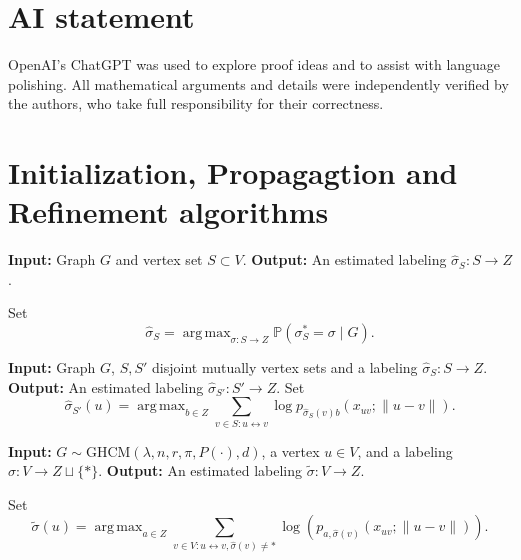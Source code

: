 \documentclass[11pt, a4paper]{amsart}
\newcommand{\1}{\mathbf{1}}
\newcommand{\visible}{\leftrightarrow{}}
\theoremstyle{definition}
\theoremstyle{remark}
\theoremstyle{definition}
\DeclareMathOperator*{\argmax}{arg\,max}
\begin{document}
\section*{AI statement}
OpenAI's ChatGPT was used to explore proof ideas and to assist with language polishing. All mathematical arguments and details were independently verified by the authors, who take full responsibility for their correctness.







\newpage
\appendix



\section{Initialization, Propagagtion and Refinement algorithms}
\setcounter{algorithm}{0}
\renewcommand{\thealgorithm}{\arabic{algorithm}}

\begin{algorithm}[H]
\caption{Maximum a Posteriori}
\label{alg:map}
\begin{algorithmic}[1]
\Statex \textbf{Input:} Graph $G$ and vertex set $S\subset V$.
\Statex \textbf{Output:} An estimated labeling $\widehat\sigma_S:S\to Z$.

\State Set
\[
    \widehat\sigma_S
    =
    \argmax_{\sigma:S\to Z}
    \mathbb P(\sigma_S^*=\sigma\mid G).
\]
\end{algorithmic}
\end{algorithm}


\begin{algorithm}[H]
\caption{Propagate}
\label{alg:propagate}
\begin{algorithmic}[1]
\Statex \textbf{Input:} Graph $G$,
$S, S'$ disjoint mutually vertex sets and a labeling $\widehat\sigma_{S}:S\to Z$.
\Statex \textbf{Output:} An estimated labeling $\widehat\sigma_{S'}: S'\to Z$.
\State Set
    \[
        \widehat\sigma_{S'}(u)
        =
        \argmax_{b\in Z}
        \sum_{v\in S: u \visible v}
        \log p_{\hat\sigma_S(v)b}(x_{uv};\|u-v\|).
    \]

\end{algorithmic}
\end{algorithm}



\begin{algorithm}[H]
\caption{Refine}
\label{alg:refine}
\begin{algorithmic}[1]
\Statex\textbf{Input:} $G\sim \mathrm{GHCM}(\lambda,n,r,\pi,P(\cdot),d)$, a vertex $u\in  V$,
and a labeling $\widehat\sigma: V\to Z\sqcup\{*\}$.
\Statex \textbf{Output:} An estimated labeling $\widetilde\sigma :  V \to Z$.

\State Set
\[
    \widetilde\sigma(u)
    =
    \argmax_{a\in Z}
    \sum_{v\in  V:u\visible v, \hat \sigma(v) \neq *}
    \log\left(p_{a,\widehat\sigma(v)}(x_{uv};\|u-v\|)\right).
\]

\end{algorithmic}
\end{algorithm}
\end{document}

